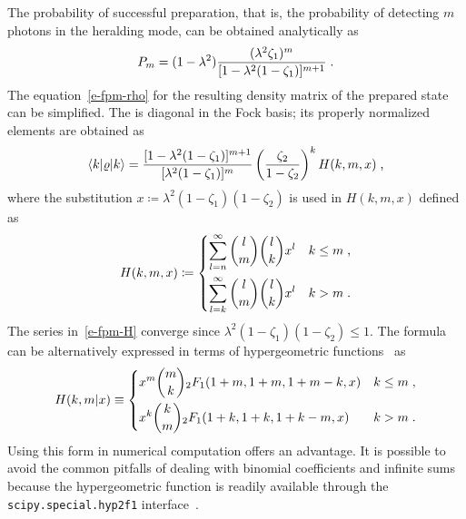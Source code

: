 \documentclass{article}
\begin{document}
The probability of successful preparation, that is, the probability of detecting $m$ photons in the heralding mode, can be obtained analytically as
%
\begin{equation}\label{e-fpm-pro}
  P_{m} = (1 - \lambda^{2}) 
  \frac
    { (\lambda^{2} \zeta_{1})^{m} }
    { [ 1 - \lambda^{2} (1 - \zeta_{1}) ]^{m + 1} } \;\text{.}
\end{equation}
%
The equation~\eqref{e-fpm-rho} for the resulting density matrix of the prepared state can be simplified. The is diagonal in the Fock basis; its properly normalized elements are obtained as
%
\begin{equation}\label{e-fpm-rho-el}
  \braket{ k | \varrho | k } =
  \frac
    { [ 1 - \lambda^{2} (1 - \zeta_{1}) ]^{m + 1} }
    { [ \lambda^{2} (1 - \zeta_{1}) ]^{m} }
  \left( \frac{ \zeta_{2} }{ 1 - \zeta_{2} } \right)^{k}
  H (k, m, x) \;\text{,}
\end{equation}
%
where the substitution ${x \coloneqq \lambda^{2} ( 1 - \zeta_{1} )(1 - \zeta_{2} )}$ is used in $H(k, m, x)$ defined as
%
\begin{equation}\label{e-fpm-H}
  H(k, m, x) \coloneq
  \begin{dcases}
    \sum_{l = n}^{\infty}
      \binom{l}{m}
      \binom{l}{k}
      x^{l} 
    & k \leq m \;\text{,} \\
    \sum_{l = k}^{\infty}
      \binom{l}{m}
      \binom{l}{k}
      x^{l}
    & k > m \;\text{.}
  \end{dcases}
\end{equation}
%
The series in~\eqref{e-fpm-H} converge since ${\lambda^{2} ( 1 - \zeta_{1} )(1 - \zeta_{2} ) \leq 1}$. The formula can be alternatively expressed in terms of hypergeometric functions~\cite{bateman1981} as
%
\begin{equation}
  H(k, m \vert x) \equiv
  \begin{dcases}
    x^{m} \binom{m}{k} {}_{2}F_{1} (1 + m, 1 + m, 1 + m - k, x)
    & k \leq m \;\text{,} \\
    x^{k} \binom{k}{m} {}_{2}F_{1} (1 + k, 1 + k, 1 + k - m, x)
    & k > m \;\text{.}
  \end{dcases}
\end{equation}
%
Using this form in numerical computation offers an advantage. It is possible to avoid the common pitfalls of dealing with binomial coefficients and infinite sums because the hypergeometric function is readily available through the \verb|scipy.special.hyp2f1| interface~\cite{virtanen2020}.

%
%
\end{document}
